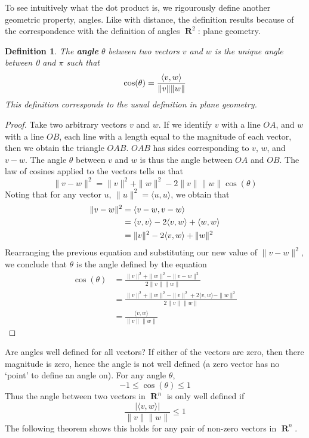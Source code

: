 \documentclass{report}
\newtheorem{definition}{Definition}
\DeclareMathOperator{\real}{\mathbf{R}}
\DeclarePairedDelimiter{\inner}{\langle}{\rangle}
\begin{document}
To see intuitively what the dot product is, we rigourously define another geometric property, angles. Like with distance, the definition results because of the correspondence with the definition of angles $\real^2$: plane geometry.

\begin{definition}
  The {\bf angle} $\theta$ between two vectors $v$ and $w$ is the unique angle between 0 and $\pi$ such that
  \[ \cos(\theta) = \frac{\inner{v, w}}{\| v \| \| w \|} \]
  This definition corresponds to the usual definition in plane geometry.
\end{definition}
\begin{proof}
  Take two arbitrary vectors $v$ and $w$. If we identify $v$ with a line $OA$, and $w$ with a line $OB$, each line with a length equal to the magnitude of each vector, then we obtain the triangle $OAB$. $OAB$ has sides corresponding to $v$, $w$, and $v-w$. The angle $\theta$ between $v$ and $w$ is thus the angle between $OA$ and $OB$. The law of cosines applied to the vectors tells us that
  \[ \| v - w \|^2 = \|v\|^2 + \|w\|^2 - 2\|v\|\|w\| \cos(\theta) \]
  Noting that for any vector $u$, $\|u\|^2 = \langle u, u \rangle$, we obtain that
  \begin{align*}
    \|v - w\|^2 &= \inner{v - w, v - w}\\
                &= \inner{v, v} - 2 \inner{v, w} + \inner{w, w}\\
                &= \|v\|^2 - 2 \inner{v, w} + \|w\|^2
  \end{align*}
  Rearranging the previous equation and substituting our new value of $\|v - w\|^2$, we conclude that $\theta$ is the angle defined by the equation
  \begin{align*}
    \cos(\theta) &= \frac{\|v\|^2 + \|w\|^2 - \|v - w\|^2}{2\|v\|\|w\|}\\
                 &= \frac{\|v\|^2 + \|w\|^2 - \|v\|^2 + 2\langle v, w \rangle - \|w\|^2}{2\|v\|\|w\|}\\
                 &= \frac{\langle v, w \rangle}{\|v\|\|w\|}
  \end{align*}
\end{proof}

Are angles well defined for all vectors? If either of the vectors are zero, then there magnitude is zero, hence the angle is not well defined (a zero vector has no `point' to define an angle on). For any angle $\theta$,
%
\[ -1 \leq \cos(\theta) \leq 1 \]
%
Thus the angle between two vectors in $\real^n$ is only well defined if
%
\[ \frac{|\langle v, w \rangle|}{\|v\|\|w\|} \leq 1\]
%
The following theorem shows this holds for any pair of non-zero vectors in $\real^n$.
\end{document}
